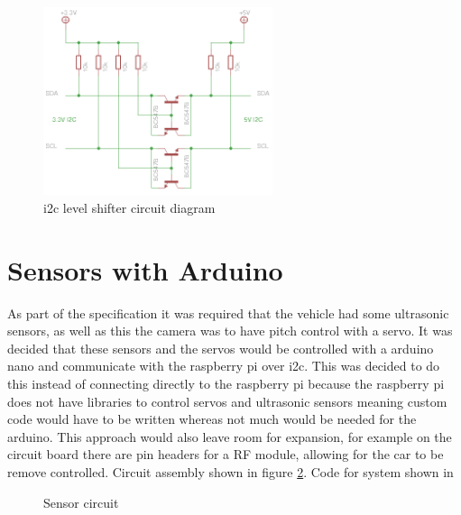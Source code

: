\begin{figure}[h]%
	\centering
	\includegraphics[width = 0.6\textwidth]{"assets/i2c_shifter_diagram"}
	\caption{i2c level shifter circuit diagram \cite{level_shifter}}
	\label{fig:i2c_level_shifter_diagram}
\end{figure}

	\section{Sensors with Arduino}
	
As part of the specification it was required that the vehicle had some ultrasonic sensors, as well as this the camera was to have pitch control with a servo. It was decided that these sensors and the servos would be controlled with a arduino nano and communicate with the raspberry pi over i2c. This was decided to do this instead of connecting directly to the raspberry pi because the raspberry pi does not have libraries to control servos and ultrasonic sensors meaning custom code would have to be written whereas not much would be needed for the arduino. This approach would also leave room for expansion, for example on the circuit board there are pin headers for a RF module, allowing for the car to be remove controlled. Circuit assembly shown in figure \ref{fig:sensor_circuit}. Code for system shown in   
	
\begin{figure}[h]%
    \centering
    \qquad
    \caption{Sensor circuit}%
    \label{fig:sensor_circuit}%
\end{figure}



